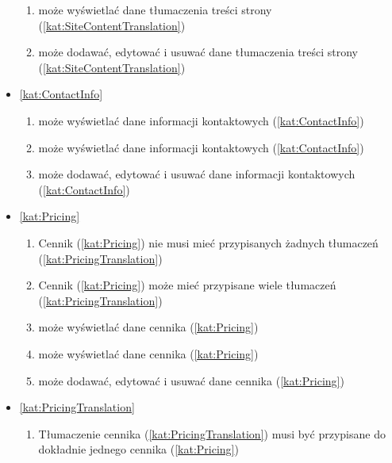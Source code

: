 \begin{itemize}[label={\textbf{Reguły dla}}, wide, labelwidth=!, labelindent=0pt]
\begin{enumerate}[label={\textbf{REG/\protect\threedigits{\arabic{enumi}}}}, wide, labelwidth=!, align=left, leftmargin=3cm, resume]
        \item {} może wyświetlać dane tłumaczenia treści strony (\ref{kat:SiteContentTranslation})
        \item {} może dodawać, edytować i usuwać dane tłumaczenia treści strony (\ref{kat:SiteContentTranslation})
    \end{enumerate}
    \item\ref{kat:ContactInfo}
    \begin{enumerate}[label={\textbf{REG/\protect\threedigits{\arabic{enumi}}}}, wide, labelwidth=!, align=left, leftmargin=3cm, resume]
        \item {} może wyświetlać dane informacji kontaktowych (\ref{kat:ContactInfo})
        \item {} może wyświetlać dane informacji kontaktowych (\ref{kat:ContactInfo})
        \item {} może dodawać, edytować i usuwać dane informacji kontaktowych (\ref{kat:ContactInfo})
    \end{enumerate}
    \item\ref{kat:Pricing}
    \begin{enumerate}[label={\textbf{REG/\protect\threedigits{\arabic{enumi}}}}, wide, labelwidth=!, align=left, leftmargin=3cm, resume]
        \item Cennik (\ref{kat:Pricing}) nie musi mieć przypisanych żadnych tłumaczeń (\ref{kat:PricingTranslation})
        \item Cennik (\ref{kat:Pricing}) może mieć przypisane wiele tłumaczeń (\ref{kat:PricingTranslation})
        \item {} może wyświetlać dane cennika (\ref{kat:Pricing})
        \item {} może wyświetlać dane cennika (\ref{kat:Pricing})
        \item {} może dodawać, edytować i usuwać dane cennika (\ref{kat:Pricing})
    \end{enumerate}
    \item\ref{kat:PricingTranslation}
    \begin{enumerate}[label={\textbf{REG/\protect\threedigits{\arabic{enumi}}}}, wide, labelwidth=!, align=left, leftmargin=3cm, resume]
        \item Tłumaczenie cennika (\ref{kat:PricingTranslation}) musi być przypisane do dokładnie jednego cennika (\ref{kat:Pricing})

\end{enumerate}
\end{itemize}
